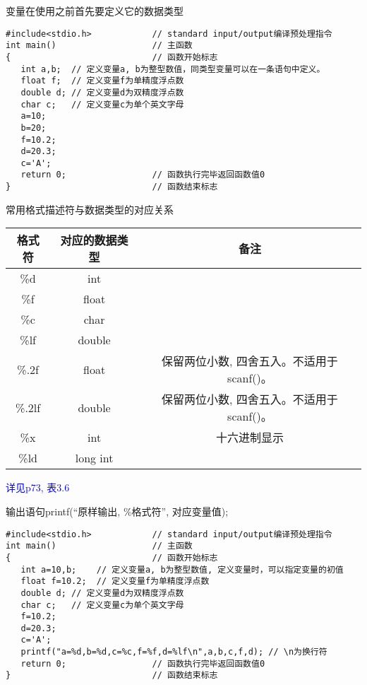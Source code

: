 \begin{frame}[fragile]{变量在使用之前首先要定义它的数据类型}
\begin{lstlisting}
#include<stdio.h>            // standard input/output编译预处理指令
int main()                   // 主函数
{                            // 函数开始标志
   int a,b;  // 定义变量a, b为整型数值，同类型变量可以在一条语句中定义。
   float f;  // 定义变量f为单精度浮点数
   double d; // 定义变量d为双精度浮点数
   char c;   // 定义变量c为单个英文字母
   a=10;
   b=20;
   f=10.2;
   d=20.3;
   c='A';
   return 0;                 // 函数执行完毕返回函数值0
}                            // 函数结束标志
\end{lstlisting}
\end{frame}

\begin{frame}{常用格式描述符与数据类型的对应关系}
\begin{tabular}{|c|c|c|}
	\hline 
	\textbf{格式符} & \textbf{对应的数据类型} &  \textbf{备注}\\ 
	\hline 
	\%d & int &  \\ 
	\hline  
	\%f & float &  \\
	\hline
	\%c & char & \\ 
	\hline   
	\%lf & double & \\ 
	\hline 
	\%.2f & float & 保留两位小数, 四舍五入。不适用于scanf()。 \\ 
	\hline 
	\%.2lf & double & 保留两位小数, 四舍五入。不适用于scanf()。 \\ 
	\hline
	\hline   
	\%x & int & 十六进制显示 \\ 
	\hline 
	\%ld & long int &  \\ 
	\hline 
\end{tabular}
\newline
\newline
\textcolor{blue}{详见p73, 表3.6}
\end{frame}

\begin{frame}[fragile]{输出语句printf(``原样输出, \%格式符'', 对应变量值);}
\begin{lstlisting}
#include<stdio.h>            // standard input/output编译预处理指令
int main()                   // 主函数
{                            // 函数开始标志
   int a=10,b;    // 定义变量a, b为整型数值, 定义变量时，可以指定变量的初值
   float f=10.2;  // 定义变量f为单精度浮点数
   double d; // 定义变量d为双精度浮点数
   char c;   // 定义变量c为单个英文字母
   f=10.2;
   d=20.3;
   c='A';
   printf("a=%d,b=%d,c=%c,f=%f,d=%lf\n",a,b,c,f,d); // \n为换行符
   return 0;                 // 函数执行完毕返回函数值0
}                            // 函数结束标志
\end{lstlisting}
\end{frame}

